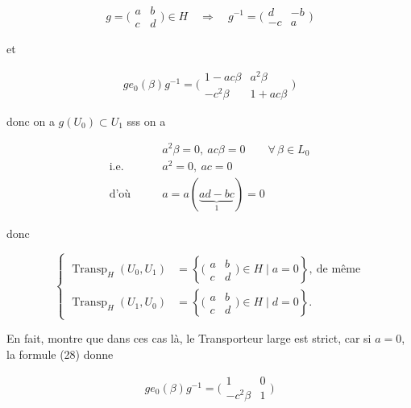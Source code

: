 \[
g=\bigl(\begin{smallmatrix}a&b\\c&d\end{smallmatrix}\bigr)\in H\quad\Longrightarrow\quad g^{-1}=\bigl(\begin{smallmatrix}d&-b\\-c&a\end{smallmatrix}\bigr)\tag*{(27)}
\]

et

\[
g e_0(\beta)g^{-1}=\bigl(\begin{smallmatrix}1-ac\beta&a^2\beta\\-c^2\beta&1+ac\beta\end{smallmatrix}\bigr)\tag*{(28)}
\]

donc on a $g(U_0)\subset U_1$ sss on a

\[
\begin{aligned}
 &a^2\beta=0,\ ac\beta=0\qquad\forall\,\beta\in L_0\\
 \text{i.e.}\qquad &a^2=0,\ ac=0\\
 \text{d'où}\qquad &a=a(\underbrace{ad-bc}_{1})=0
\end{aligned}
\]

donc

\[
\left\{\begin{aligned}
 \operatorname{Transp}_H(U_0,U_1)&=\left\{\bigl(\begin{smallmatrix}a&b\\c&d\end{smallmatrix}\bigr)\in H\mid a=0\right\},\ \text{de même}\\
 \operatorname{Transp}_H(U_1,U_0)&=\left\{\bigl(\begin{smallmatrix}a&b\\c&d\end{smallmatrix}\bigr)\in H\mid d=0\right\}.
\end{aligned}\right.\tag*{(29)}
\]


  En fait,     montre que dans ces cas là, le Transporteur large est strict, car si $a=0$, la formule (28) donne

\[
g e_0(\beta)g^{-1}=\bigl(\begin{smallmatrix}1&0\\-c^2\beta&1\end{smallmatrix}\bigr)\tag*{$(28')$}
\]

